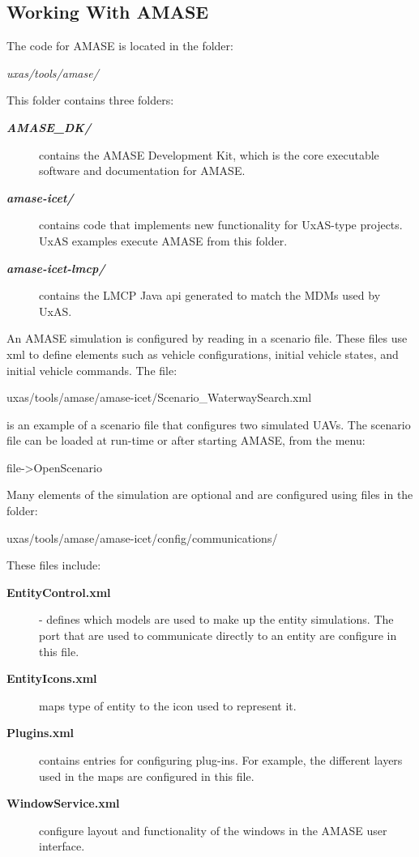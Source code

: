 \subsection{Working With AMASE}
The code for AMASE is located in the folder:
\begin{docspec}
    \textit{uxas/tools/amase/}
\end{docspec}
This folder contains three folders:
\begin{description}
\item[\textbf{\textit{AMASE\_DK/}}] contains the AMASE Development Kit, which is the core  executable software and documentation for AMASE.
\item[\textbf{\textit{amase-icet/}}] contains code that implements new functionality for UxAS-type projects. UxAS examples execute AMASE from this folder.  
\item[\textbf{\textit{amase-icet-lmcp/}}] contains the LMCP Java api generated to match the MDMs used by UxAS.
\end{description}

An AMASE simulation is configured by reading in a scenario file. These files use xml to define elements such as vehicle configurations, initial vehicle states, and initial vehicle commands. The file:
\begin{docspec}
	uxas/tools/amase/amase-icet/Scenario\_WaterwaySearch.xml
\end{docspec}
is an example of a scenario file that configures two simulated UAVs. The scenario file can be loaded at run-time or after starting AMASE, from the menu:
\begin{docspec}
	file->OpenScenario
\end{docspec}
Many elements of the simulation are optional and are configured using files in the folder:
\begin{docspec}
	uxas/tools/amase/amase-icet/config/communications/
\end{docspec}
These files include:
\begin{description}
\item[\textbf{EntityControl.xml}] - defines which models are used to make up the entity simulations. The port that are used to communicate directly to an entity are configure in this file. 
\item[\textbf{EntityIcons.xml}] maps type of entity to the icon used to represent it.
\item[\textbf{Plugins.xml}] contains entries for configuring plug-ins. For example, the different layers used in the maps are configured in this file. 
\item[\textbf{WindowService.xml}] configure layout and functionality of the windows in the AMASE user interface.
\end{description}

